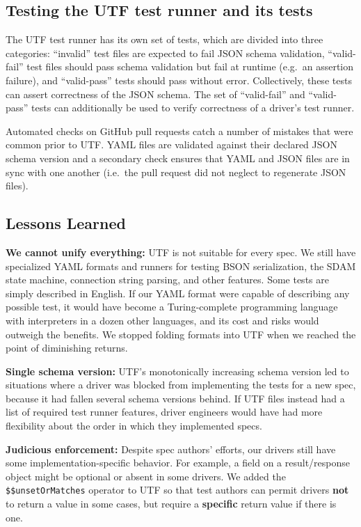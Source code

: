 \documentclass[conference]{IEEEtran}
\begin{document}
\subsection{Testing the UTF test runner and its tests}

The UTF test runner has its own set of tests, which are divided into three categories: ``invalid'' test files are expected to fail JSON schema validation, ``valid-fail'' test files should pass schema validation but fail at runtime (e.g.\ an assertion failure), and ``valid-pass'' tests should pass without error. Collectively, these tests can assert correctness of the JSON schema. The set of ``valid-fail'' and ``valid-pass'' tests can additionally be used to verify correctness of a driver's test runner.

Automated checks on GitHub pull requests catch a number of mistakes that were common prior to UTF. YAML files are validated against their declared JSON schema version and a secondary check ensures that YAML and JSON files are in sync with one another (i.e.\ the pull request did not neglect to regenerate JSON files).

\subsection{Lessons Learned}

\textbf{We cannot unify everything:} UTF is not suitable for every spec. We still have specialized YAML formats and runners for testing BSON serialization, the SDAM state machine, connection string parsing, and other features. Some tests are simply described in English. If our YAML format were capable of describing any possible test, it would have become a Turing-complete programming language with interpreters in a dozen other languages, and its cost and risks would outweigh the benefits. We stopped folding formats into UTF when we reached the point of diminishing returns.

\textbf{Single schema version:} UTF's monotonically increasing schema version led to situations where a driver was blocked from implementing the tests for a new spec, because it had fallen several schema versions behind. If UTF files instead had a list of required test runner features, driver engineers would have had more flexibility about the order in which they implemented specs.

\textbf{Judicious enforcement:} Despite spec authors' efforts, our drivers still have some implementation-specific behavior. For example, a field on a result/response object might be optional or absent in some drivers. We added the \texttt{\$\$unsetOrMatches} operator to UTF so that test authors can permit drivers \textbf{not} to return a value in some cases, but require a \textbf{specific} return value if there is one.
\end{document}
